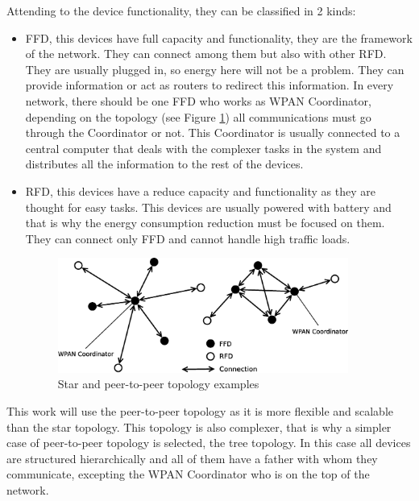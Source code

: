 Attending to the device functionality, they can be classified in 2 kinds:

\begin{itemize}
 \item \acl{FFD}, this devices have full capacity and functionality, they are the framework of the network. They can connect 
among them but also with other \ac{RFD}. They are usually plugged in, so energy here will not be a problem. They can provide 
information or act as routers to redirect this information. In every network, there should be one \ac{FFD} who works as \ac{WPAN}
Coordinator, depending on the topology (see Figure \ref{fig:WPAN_Network_Topologies}) all communications must go through the 
Coordinator or not. This Coordinator is usually connected to a central computer that deals with the complexer tasks in the system 
and distributes all the information to the rest of the devices.
 \item \acl{RFD}, this devices have a reduce capacity and functionality as they are thought for easy tasks. This devices are
usually powered with battery and that is why the energy consumption reduction must be focused on them. They can connect only
\ac{FFD} and cannot handle high traffic loads.

\vspace*{1cm}

\begin{figure}[here]
 \begin{center}
  \includegraphics[width=0.9\textwidth]{WPAN_Network_Topologies.eps}
 \end{center}
 \caption{Star and peer-to-peer topology examples \cite{IEEE802.15.4-2003}}
 \label{fig:WPAN_Network_Topologies}
\end{figure}
\end{itemize}
This work will use the peer-to-peer topology as it is more flexible and scalable than the star topology. This topology is also
complexer, that is why a simpler case of peer-to-peer topology is selected, the tree topology. In this case all devices are
structured hierarchically and all of them have a father with whom they communicate, excepting the \ac{WPAN} Coordinator who is on the top of the network.

